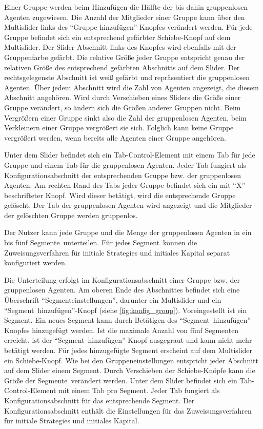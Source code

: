 \documentclass[parskip=full,11pt]{scrartcl}
\def\segment{Segment}
\def\segments{Segmente}
\begin{document}
Einer Gruppe werden beim Hinzufügen die Hälfte der bis dahin gruppenlosen Agenten zugewiesen. Die Anzahl der Mitglieder einer Gruppe kann über den \Gls{Multislider} links des \enquote{Gruppe hinzufügen}-Knopfes verändert werden. Für jede Gruppe befindet sich ein entsprechend gefärbter Schiebe-Knopf auf dem \Gls{Multislider}. Der \Gls{Slider-Abschnitt} links des Knopfes wird ebenfalls mit der Gruppenfarbe gefärbt. Die relative Größe jeder Gruppe entspricht genau der relativen Größe des entsprechend gefärbten Abschnitts auf dem Slider. Der rechtsgelegenste Abschnitt ist weiß gefärbt und repräsentiert die gruppenlosen Agenten. Über jedem Abschnitt wird die Zahl von Agenten angezeigt, die diesem Abschnitt angehören. Wird durch Verschieben eines Sliders die Größe einer Gruppe verändert, so ändern sich die Größen anderer Gruppen nicht. Beim Vergrößern einer Gruppe sinkt also die Zahl der gruppenlosen Agenten, beim Verkleinern einer Gruppe vergrößert sie sich. Folglich kann keine Gruppe vergrößert werden, wenn bereits alle Agenten einer Gruppe angehören.

Unter dem Slider befindet sich ein Tab-Control-Element mit einem Tab für jede Gruppe und einem Tab für die gruppenlosen Agenten. Jeder Tab fungiert als Konfigurationsabschnitt der entsprechenden Gruppe bzw. der gruppenlosen Agenten. Am rechten Rand des Tabs jeder Gruppe befindet sich ein mit \enquote{X} beschrifteter Knopf. Wird dieser betätigt, wird die entsprechende Gruppe gelöscht. Der Tab der gruppenlosen Agenten wird angezeigt und die Mitglieder der gelöschten Gruppe werden gruppenlos.

\functionality{Einteilung von Gruppen in \segments}{fnc:segments}
Der \Gls{Nutzer} kann jede Gruppe und die Menge der gruppenlosen Agenten in ein bis fünf \segments\ unterteilen. Für jedes \segment\ können die Zuweisungsverfahren für initiale \Glspl{Strategie} und initiales \Gls{Kapital} separat konfiguriert werden.

Die Unterteilung erfolgt im Konfigurationsabschnitt einer Gruppe bzw. der gruppenlosen Agenten. Am oberen Ende des Abschnittes befindet sich eine Überschrift \enquote{\segment einstellungen}, darunter ein \Gls{Multislider} und ein \enquote{\segment\ hinzufügen}-Knopf (siehe \cref{fig:konfig_group}). Voreingestellt ist ein Segment. Ein neues Segment kann durch Betätigen des \enquote{\segment\ hinzufügen}-Knopfes hinzugefügt werden. Ist die maximale Anzahl von fünf \segments n erreicht, ist der \enquote{\segment\ hinzufügen}-Knopf ausgegraut und kann nicht mehr betätigt werden. Für jedes hinzugefügte Segment erscheint auf dem \Gls{Multislider} ein Schiebe-Knopf. Wie bei den Gruppeneinstellungen entspricht jeder Abschnitt auf dem Slider einem \segment. Durch Verschieben der Schiebe-Knöpfe kann die Größe der \segments\ verändert werden. Unter dem Slider befindet sich ein Tab-Control-Element mit einem Tab pro \segment. Jeder Tab fungiert als Konfigurationsabschnitt für das entsprechende \segment. Der Konfigurationsabschnitt enthält die Einstellungen für das Zuweisungsverfahren für initiale \Glspl{Strategie} und initiales \Gls{Kapital}.
\end{document}
